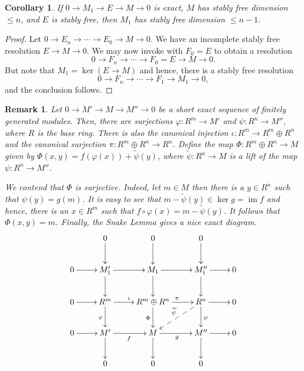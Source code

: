 \documentclass[12pt]{article}
\theoremstyle{thmstyle}
\theoremstyle{defstyle}
\newtheorem*{corollary}{Corollary}
\newtheorem{remark}[theorem]{Remark}
\newcommand{\im}{\operatorname{im}}
\newcommand{\wt}[1]{\widetilde{#1}}
\renewcommand{\le}{\leqslant}
\begin{document}
\begin{corollary}
    If $0\to M_1\to E\to M\to 0$ is exact, $M$ has stably free dimension $\le n$, and $E$ is stably free, then $M_1$ has stably free dimension $\le n - 1$.
\end{corollary}
\begin{proof}
    Let $0\to E_n\to\cdots\to E_0\to M\to 0$. We have an incomplete stably free resolution $E\to M\to 0$. We may now invoke  with $F_0 = E$ to obtain a resolution 
    \begin{equation*}
        0\to F_n\to\cdots\to F_0 = E\to M\to 0.
    \end{equation*}
    But note that $M_1 = \ker(E\to M)$ and hence, there is a stably free resolution 
    \begin{equation*}
        0\to F_n\to\cdots\to F_1\to M_1\to 0,
    \end{equation*}
    and the conclusion follows.
\end{proof}

\begin{remark}
    Let $0\to M'\to M\to M''\to 0$ be a short exact sequence of finitely generated modules. Then, there are surjections $\varphi: R^m\to M'$ and $\psi: R^n\to M''$, where $R$ is the base ring. There is also the canonical injection $\iota: R^m\to R^m\oplus R^n$ and the canonical surjection $\pi: R^m\oplus R^n\to R^n$. Define the map $\Phi: R^m\oplus R^n\to M$ given by $\Phi(x, y) = f(\varphi(x)) + \wt\psi(y)$, where $\wt\psi: R^n\to M$ is a lift of the map $\psi: R^n\to M''$. 

    We contend that $\Phi$ is surjective. Indeed, let $m\in M$ then there is a $y\in R^n$ such that $\psi(y) = g(m)$. It is easy to see that $m - \wt\psi(y)\in\ker g = \im f$ and hence, there is an $x\in R^m$ such that $f\circ\varphi(x) = m - \wt\psi(y)$. It follows that $\Phi(x, y) = m$. Finally, the Snake Lemma gives a nice exact diagram.
    \begin{equation*}
        \xymatrix {
            & 0\ar[d] & 0\ar[d] & 0\ar[d] & \\
            0\ar[r] & M_1'\ar[r]\ar[d] & M_1\ar[r]\ar[d] & M_1''\ar[r]\ar[d] & 0\\
            0\ar[r] & R^m\ar[r]^\iota\ar[d]_{\varphi} & R^m\oplus R^n\ar[r]^\pi\ar[d]_{\Phi} & R^n\ar[r]\ar[d]^{\psi}\ar@{-->}[ld]_{\wt\psi} & 0\\
            0\ar[r] & M'\ar[r]_f\ar[d] & M\ar[r]_g\ar[d] & M''\ar[r]\ar[d] & 0\\
            & 0 & 0 & 0 &
        }
    \end{equation*}
\end{remark}
\end{document}
